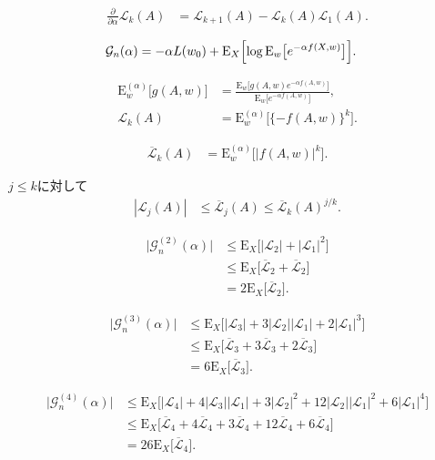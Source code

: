 \documentclass[11pt,a4paper]{jsarticle}
\newcommand{\E}{\mathrm{E}}
\begin{document}
\begin{align}
\frac{\partial}{\partial \alpha} \mathcal{L}_k (A)
& =
\mathcal{L}_{k+1} (A) - \mathcal{L}_k (A) \mathcal{L}_1 (A). \nonumber
\end{align}

\begin{align}
\mathcal{G}_n (\alpha)
& =
- \alpha L (w_0) + \E_X \Bigl[ \log \E_w \bigl[ e^{- \alpha f (X, w)} \bigr] \Bigr]. \nonumber
\end{align}

\begin{align}
\E_w^{(\alpha)} \bigl[ g (A, w) \bigr]
& =
\frac{\E_w \bigl[ g (A, w) e^{- \alpha f (A, w)} \bigr]}{\E_w \bigl[ e^{- \alpha f (A, w)} \bigr]}, \nonumber \\
\mathcal{L}_k (A)
& =
\E_w^{(\alpha)} \bigl[ \{ -f (A, w) \}^k \bigr]. \nonumber
\end{align}

\begin{align}
\overline{\mathcal{L}}_k (A)
& =
\E_w^{(\alpha)} \bigl[ | f (A, w) |^k \bigr]. \nonumber
\end{align}

$j \leq k$に対して
\begin{align}
| \mathcal{L}_j (A) |
& \leq
\overline{\mathcal{L}}_j (A) \leq \overline{\mathcal{L}}_k (A)^{j/k}. \nonumber
\end{align}

\begin{align}
\bigl| \mathcal{G}_n^{(2)} (\alpha) \bigr|
& \leq
\E_X \bigl[ |\mathcal{L}_2| + |\mathcal{L}_1|^2 \bigr] \nonumber \\
& \leq
\E_X \bigl[ \overline{\mathcal{L}}_2 + \overline{\mathcal{L}}_2 \bigr] \nonumber \\
& =
2 \E_X \bigl[ \overline{\mathcal{L}}_2 \bigr]. \nonumber
\end{align}

\begin{align}
\bigl| \mathcal{G}_n^{(3)} (\alpha) \bigr|
& \leq
\E_X \bigl[ |\mathcal{L}_3| + 3 |\mathcal{L}_2| |\mathcal{L}_1| + 2 |\mathcal{L}_1|^3 \bigr] \nonumber \\
& \leq
\E_X \bigl[ \overline{\mathcal{L}}_3 + 3 \overline{\mathcal{L}}_3 + 2 \overline{\mathcal{L}}_3 \bigr] \nonumber \\
& =
6 \E_X \bigl[ \overline{\mathcal{L}}_3 \bigr]. \nonumber
\end{align}

\begin{align}
\bigl| \mathcal{G}_n^{(4)} (\alpha) \bigr|
& \leq
\E_X \bigl[ |\mathcal{L}_4| + 4 |\mathcal{L}_3| |\mathcal{L}_1| + 3 |\mathcal{L}_2|^2 + 12 |\mathcal{L}_2| |\mathcal{L}_1|^2 + 6 |\mathcal{L}_1|^4 \bigr] \nonumber \\
& \leq
\E_X \bigl[ \overline{\mathcal{L}}_4 + 4 \overline{\mathcal{L}}_4 + 3 \overline{\mathcal{L}}_4 + 12 \overline{\mathcal{L}}_4 + 6 \overline{\mathcal{L}}_4 \bigr] \nonumber \\
& =
26 \E_X \bigl[ \overline{\mathcal{L}}_4	 \bigr]. \nonumber
\end{align}
\end{document}
